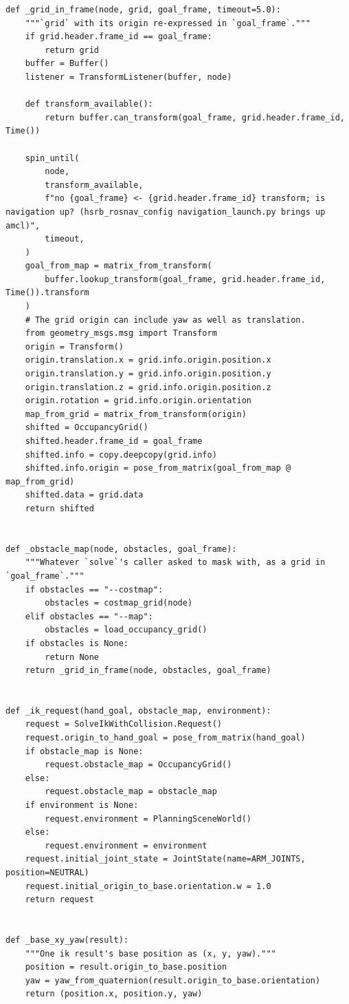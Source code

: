\documentclass[11pt,a4paper]{book}
\begin{document}
\begin{lstlisting}
def _grid_in_frame(node, grid, goal_frame, timeout=5.0):
    """`grid` with its origin re-expressed in `goal_frame`."""
    if grid.header.frame_id == goal_frame:
        return grid
    buffer = Buffer()
    listener = TransformListener(buffer, node)

    def transform_available():
        return buffer.can_transform(goal_frame, grid.header.frame_id, Time())

    spin_until(
        node,
        transform_available,
        f"no {goal_frame} <- {grid.header.frame_id} transform; is navigation up? (hsrb_rosnav_config navigation_launch.py brings up amcl)",
        timeout,
    )
    goal_from_map = matrix_from_transform(
        buffer.lookup_transform(goal_frame, grid.header.frame_id, Time()).transform
    )
    # The grid origin can include yaw as well as translation.
    from geometry_msgs.msg import Transform
    origin = Transform()
    origin.translation.x = grid.info.origin.position.x
    origin.translation.y = grid.info.origin.position.y
    origin.translation.z = grid.info.origin.position.z
    origin.rotation = grid.info.origin.orientation
    map_from_grid = matrix_from_transform(origin)
    shifted = OccupancyGrid()
    shifted.header.frame_id = goal_frame
    shifted.info = copy.deepcopy(grid.info)
    shifted.info.origin = pose_from_matrix(goal_from_map @ map_from_grid)
    shifted.data = grid.data
    return shifted


def _obstacle_map(node, obstacles, goal_frame):
    """Whatever `solve`'s caller asked to mask with, as a grid in `goal_frame`."""
    if obstacles == "--costmap":
        obstacles = costmap_grid(node)
    elif obstacles == "--map":
        obstacles = load_occupancy_grid()
    if obstacles is None:
        return None
    return _grid_in_frame(node, obstacles, goal_frame)


def _ik_request(hand_goal, obstacle_map, environment):
    request = SolveIkWithCollision.Request()
    request.origin_to_hand_goal = pose_from_matrix(hand_goal)
    if obstacle_map is None:
        request.obstacle_map = OccupancyGrid()
    else:
        request.obstacle_map = obstacle_map
    if environment is None:
        request.environment = PlanningSceneWorld()
    else:
        request.environment = environment
    request.initial_joint_state = JointState(name=ARM_JOINTS, position=NEUTRAL)
    request.initial_origin_to_base.orientation.w = 1.0
    return request


def _base_xy_yaw(result):
    """One ik result's base position as (x, y, yaw)."""
    position = result.origin_to_base.position
    yaw = yaw_from_quaternion(result.origin_to_base.orientation)
    return (position.x, position.y, yaw)



\end{lstlisting}
\end{document}
